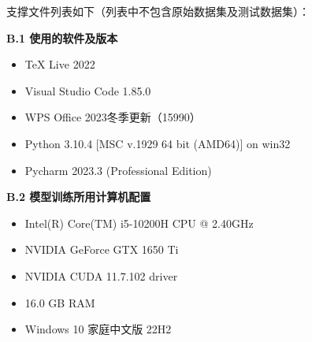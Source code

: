 \documentclass{MathorCupmodeling}
\begin{document}
	支撑文件列表如下（列表中不包含原始数据集及测试数据集）：
	\begin{table}[H]
		\centering
	\end{table}
  
\newpage

	\textbf{B.1 使用的软件及版本}
	\begin{itemize}
		\item TeX Live 2022
		\item Visual Studio Code 1.85.0
		\item WPS Office 2023冬季更新（15990）
		\item Python 3.10.4 [MSC v.1929 64 bit (AMD64)] on win32
		\item Pycharm 2023.3 (Professional Edition)
	\end{itemize}
	
	\textbf{B.2 模型训练所用计算机配置}
	\begin{itemize}
		\item Intel(R) Core(TM) i5-10200H CPU @ 2.40GHz
		\item NVIDIA GeForce GTX 1650 Ti
		\item NVIDIA CUDA 11.7.102 driver
		\item 16.0 GB RAM
		\item Windows 10 家庭中文版 22H2
	\end{itemize}
\end{document}

